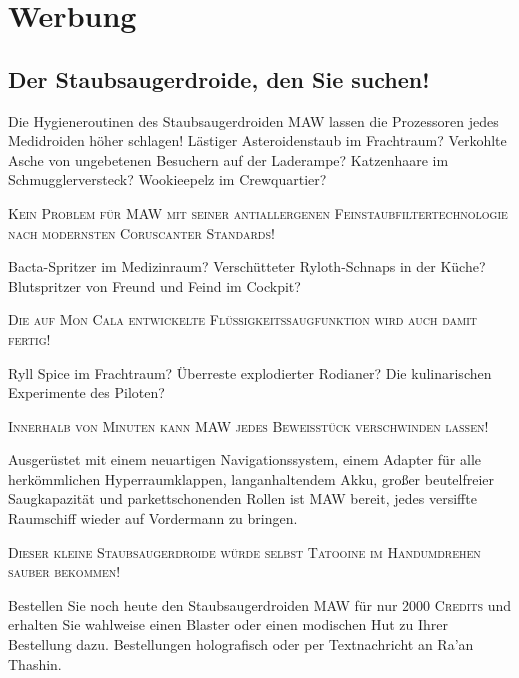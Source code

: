 \documentclass[final]{multiversum}
\begin{document}
\section{Werbung}
\subsection{Der Staubsaugerdroide, den Sie suchen!}

Die Hygieneroutinen des Staubsaugerdroiden MAW lassen die Prozessoren jedes Medidroiden höher schlagen!
Lästiger Asteroidenstaub im Frachtraum?
Verkohlte Asche von ungebetenen Besuchern auf der Laderampe?
Katzenhaare im Schmugglerversteck? Wookieepelz im Crewquartier?\\
\begin{center}\textsc{Kein Problem für MAW mit seiner antiallergenen Feinstaubfiltertechnologie nach modernsten Coruscanter Standards!}\\\end{center}
Bacta-Spritzer im Medizinraum?
Verschütteter Ryloth-Schnaps in der Küche?
Blutspritzer von Freund und Feind im Cockpit?\\
\begin{center}\textsc{Die auf Mon Cala entwickelte Flüssigkeitssaugfunktion wird auch damit fertig!}\\\end{center}
Ryll Spice im Frachtraum?
Überreste explodierter Rodianer?
Die kulinarischen Experimente des Piloten?
\begin{center}\textsc{Innerhalb von Minuten kann MAW jedes Beweisstück verschwinden lassen!}\\\end{center}
Ausgerüstet mit einem neuartigen Navigationssystem, einem Adapter für alle herkömmlichen Hyperraumklappen, langanhaltendem Akku, großer beutelfreier Saugkapazität und parkettschonenden Rollen ist MAW bereit, jedes versiffte Raumschiff wieder auf Vordermann zu bringen.
\begin{center}\textsc{Dieser kleine Staubsaugerdroide würde selbst Tatooine im Handumdrehen sauber bekommen!}\\\end{center}
Bestellen Sie noch heute den Staubsaugerdroiden MAW für nur \textsc{2000 Credits} und erhalten Sie wahlweise einen Blaster oder einen modischen Hut zu Ihrer Bestellung dazu. 
Bestellungen holografisch oder per Textnachricht an Ra'an Thashin.\\
\end{document}
